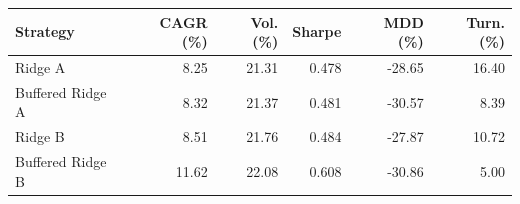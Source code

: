 \begin{tabular}{lrrrrr}
\toprule
Strategy & CAGR (\%) & Vol. (\%) & Sharpe & MDD (\%) & Turn. (\%) \\
\midrule
Ridge A & 8.25 & 21.31 & 0.478 & -28.65 & 16.40 \\
Buffered Ridge A & 8.32 & 21.37 & 0.481 & -30.57 & 8.39 \\
Ridge B & 8.51 & 21.76 & 0.484 & -27.87 & 10.72 \\
Buffered Ridge B & 11.62 & 22.08 & 0.608 & -30.86 & 5.00 \\
\bottomrule
\end{tabular}
